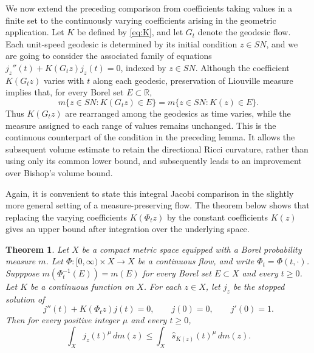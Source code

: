 \documentclass[11pt, reqno]{amsart}
\newtheorem{theorem}{Theorem}
\begin{document}
We now extend the preceding comparison from coefficients taking values in a finite set to the continuously varying coefficients arising in the geometric application. Let $K$ be defined by \eqref{eq:K}, and let $G_t$ denote the geodesic flow. Each unit-speed geodesic is determined by its initial condition $z\in SN$, and we are going to consider the associated family of equations $j_z''(t)+K(G_tz)j_z(t)=0$, indexed by $z\in SN$. Although the coefficient $K(G_tz)$ varies with $t$ along each geodesic, preservation of Liouville measure implies that, for every Borel set $E\subset\mathbb R$,
$$
m\{z\in SN:K(G_tz)\in E\} = m\{z\in SN:K(z)\in E\}.
$$
Thus $K(G_t z)$ are rearranged among the geodesics as time varies, while the measure assigned to each range of values remains unchanged. This is the continuous counterpart of the condition in the preceding lemma. It allows the subsequent volume estimate to retain the directional Ricci curvature, rather than using only its common lower bound, and subsequently leads to an improvement over Bishop's volume bound.

Again, it is convenient to state this integral Jacobi comparison in the slightly more general setting of a measure-preserving flow. The theorem below shows that replacing the varying coefficients $K(\Phi_tz)$ by the constant coefficients $K(z)$ gives an upper bound after integration over the underlying space.
\begin{theorem} \label{thm:continuum-shuffle}
Let $X$ be a compact metric space equipped with a Borel probability measure $m$. Let $\Phi:[0, \infty)\times X\longrightarrow X$ be a continuous flow, and write $\Phi_t=\Phi(t, \cdot)$. Supppose $m(\Phi_t^{-1}(E))=m(E)$ for every Borel set $E\subset X$ and every $t\ge 0$. Let $K$ be a continuous function on $X$. For each $z\in X$, let $j_z$ be the stopped solution of
\begin{equation*}\label{eq:flow-jacobi}
j''(t)+K(\Phi_tz)j(t)=0, \qquad j(0)=0, \qquad j'(0)=1.
\end{equation*}
Then for every positive integer $\mu$ and every $t\ge 0$,
\begin{equation*}\label{eq:continuum-shuffle}
\int_Xj_z(t)^\mu\, dm(z) \le \int_X\widehat s_{K(z)}(t)^\mu\, dm(z).
\end{equation*}
\end{theorem}
\end{document}
